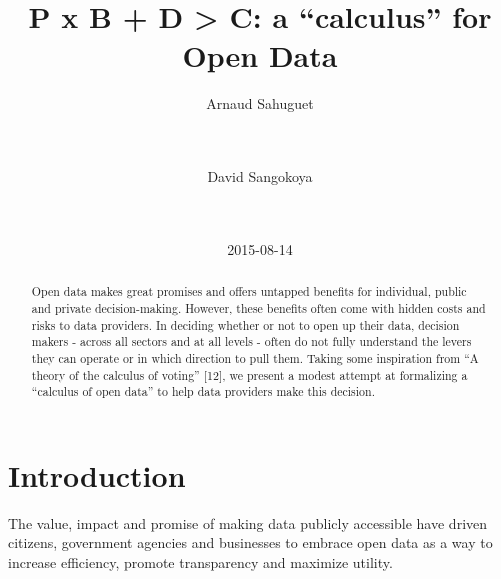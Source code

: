\documentclass[]{acm_proc_article-sp}
\begin{document}
\title{P x B + D \textgreater{} C: a ``calculus'' for Open Data}



\author{
  Arnaud Sahuguet
      \\
          \\
          \\
  \and
  David Sangokoya
      \\
          \\
          \\
  \and
}




\date{2015-08-14}

\maketitle

\begin{abstract}
Open data makes great promises and offers untapped benefits for
individual, public and private decision-making. However, these benefits
often come with hidden costs and risks to data providers. In deciding
whether or not to open up their data, decision makers - across all
sectors and at all levels - often do not fully understand the levers
they can operate or in which direction to pull them. Taking some
inspiration from ``A theory of the calculus of voting'' {[}12{]}, we
present a modest attempt at formalizing a ``calculus of open data'' to
help data providers make this decision.
\end{abstract}


\section{Introduction}\label{introduction}

The value, impact and promise of making data publicly accessible have
driven citizens, government agencies and businesses to embrace open data
as a way to increase efficiency, promote transparency and maximize
utility.
\end{document}
